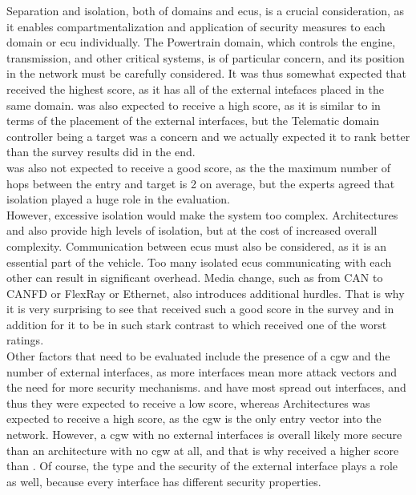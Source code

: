 Separation and isolation, both of domains and \acrshort{ecu}s, is a crucial consideration, as it enables compartmentalization and application of security measures to each domain or \acrshort{ecu} individually. 
The Powertrain domain, which controls the engine, transmission, and other critical systems, is of particular concern, and its position in the network must be carefully considered. 
It was thus somewhat expected that  received the highest score, as it has all of the external intefaces placed in the same domain.
 was also expected to receive a high score, as it is similar to  in terms of the placement of the external interfaces,
but the Telematic domain controller being a target was a concern and we actually expected it to rank better than the survey results did in the end.\\
 was also not expected to receive a good score, as the the maximum number of hops between the entry and target is 2 on average,
but the experts agreed that isolation played a huge role in the evaluation.\\

However, excessive isolation would make the system too complex. 
Architectures  and  also provide high levels of isolation, but at the cost of increased overall complexity.
Communication between \acrshort{ecu}s must also be considered, as it is an essential part of the vehicle. 
Too many isolated \acrshort{ecu}s communicating with each other can result in significant overhead. 
Media change, such as from CAN to CANFD or FlexRay or Ethernet, also introduces additional hurdles.
That is why it is very surprising to see that  received such a good score in the survey
and in addition for it to be in such stark contrast to  which received one of the worst ratings.\\

Other factors that need to be evaluated include the presence of a \acrshort{cgw} and the number of external interfaces, 
as more interfaces mean more attack vectors and the need for more security mechanisms.
 and  have most spread out interfaces, and thus they were expected to receive a low score,
whereas Architectures  was expected to receive a high score, as the \acrshort{cgw} is the only entry vector into the network.
However, a \acrshort{cgw} with no external interfaces is overall likely more secure than an architecture with no \acrshort{cgw} at all, and that is why 
 received a higher score than . 
Of course, the type and the security of the external interface plays a role as well, because every interface has different security properties.\\


